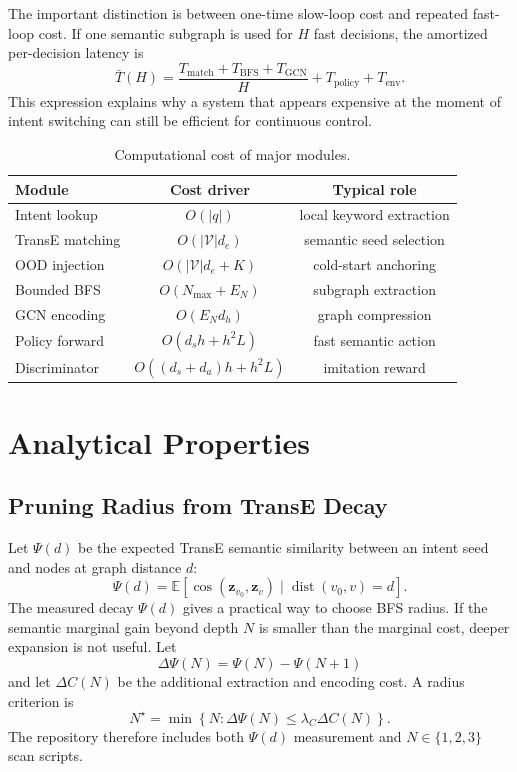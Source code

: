 \documentclass[journal]{IEEEtran}
\newcommand{\calV}{\mathcal{V}}
\newcommand{\bbE}{\mathbb{E}}
\begin{document}
The important distinction is between one-time slow-loop cost and repeated fast-loop cost. If one semantic subgraph is used for $H$ fast decisions, the amortized per-decision latency is
\begin{equation}
\bar{T}(H)=\frac{T_{\mathrm{match}}+T_{\mathrm{BFS}}+T_{\mathrm{GCN}}}{H}
+T_{\mathrm{policy}}+T_{\mathrm{env}}.
\label{eq:amortized_latency}
\end{equation}
This expression explains why a system that appears expensive at the moment of intent switching can still be efficient for continuous control.

\begin{table}[!t]
\centering
\caption{Computational cost of major modules.}
\label{tab:complexity}
\begin{tabular}{lcc}
\toprule
Module & Cost driver & Typical role\\
\midrule
Intent lookup & $O(|q|)$ & local keyword extraction\\
TransE matching & $O(|\calV|d_e)$ & semantic seed selection\\
OOD injection & $O(|\calV|d_e+K)$ & cold-start anchoring\\
Bounded BFS & $O(N_{\max}+E_N)$ & subgraph extraction\\
GCN encoding & $O(E_Nd_h)$ & graph compression\\
Policy forward & $O(d_sh+h^2L)$ & fast semantic action\\
Discriminator & $O((d_s+d_a)h+h^2L)$ & imitation reward\\
\bottomrule
\end{tabular}
\end{table}

\section{Analytical Properties}

\subsection{Pruning Radius from TransE Decay}

Let $\Psi(d)$ be the expected TransE semantic similarity between an intent seed and nodes at graph distance $d$:
\begin{equation}
\Psi(d)=
\bbE\left[
\cos(\mathbf{z}_{v_0},\mathbf{z}_{v})
\;|\;\operatorname{dist}(v_0,v)=d
\right].
\label{eq:psi}
\end{equation}
The measured decay $\Psi(d)$ gives a practical way to choose BFS radius. If the semantic marginal gain beyond depth $N$ is smaller than the marginal cost, deeper expansion is not useful. Let
\begin{equation}
\Delta\Psi(N)=\Psi(N)-\Psi(N+1)
\end{equation}
and let $\Delta C(N)$ be the additional extraction and encoding cost. A radius criterion is
\begin{equation}
N^\star =
\min\left\{N:
\Delta\Psi(N)\leq \lambda_C \Delta C(N)
\right\}.
\label{eq:nstar}
\end{equation}
The repository therefore includes both $\Psi(d)$ measurement and $N\in\{1,2,3\}$ scan scripts.
\end{document}
